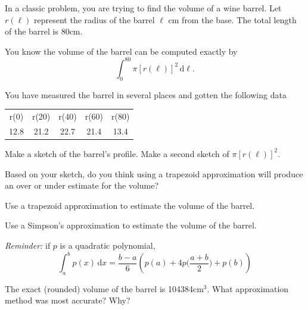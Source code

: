 \documentclass{workbook}
\begin{document}
\begin{slide}
	\question
	In a classic problem, you are trying to find the volume of a wine barrel.
	Let $r(\ell)$ represent the radius of the barrel $\ell$ cm from the base. The total
	length of the barrel is 80cm.

	You know the volume of the barrel can be computed exactly by
	\[
		\int_0^{80}\pi [r(\ell)]^2\,\mathrm d \ell.
	\]

	You have measured the barrel in several places and gotten the following data
	\begin{center}
		\begin{tabular}{ccccc}
			r(0) & r(20) & r(40) & r(60) & r(80) \\
			12.8 & 21.2  & 22.7  & 21.4  & 13.4  \\
		\end{tabular}
	\end{center}

	\begin{parts}
		\item Make a sketch of the barrel's profile. Make a second sketch of $\pi [r(\ell)]^2$.

		\item Based on your sketch, do you think using a trapezoid approximation will produce an over
		or under estimate for the volume?

		\item Use a trapezoid approximation to estimate the volume of the barrel.

		\item Use a Simpson's approximation to estimate the volume of the barrel.

		\emph{Reminder:}
		if $p$ is a quadratic polynomial,
		\[
			\int_a^b p(x)\,\mathrm d x = \frac{b-a}{6}\left(p(a)+4p\Big(\frac{a+b}{2}\Big)+p(b)\right)
		\]

		\item The exact (rounded) volume of the barrel is 104384cm$^3$. What approximation
		method was most accurate? Why?


	\end{parts}
\end{slide}
\end{document}

